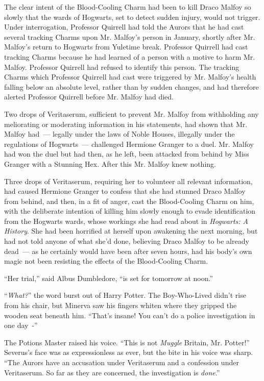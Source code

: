 The clear intent of the Blood-Cooling Charm had been to kill Draco Malfoy so slowly that the wards of Hogwarts, set to detect sudden injury, would not trigger. Under interrogation, Professor Quirrell had told the Aurors that he had cast several tracking Charms upon Mr. Malfoy's person in January, shortly after Mr. Malfoy's return to Hogwarts from Yuletime break. Professor Quirrell had cast tracking Charms because he had learned of a person with a motive to harm Mr. Malfoy. Professor Quirrell had refused to identify this person. The tracking Charms which Professor Quirrell had cast were triggered by Mr. Malfoy's health falling below an absolute level, rather than by sudden changes, and had therefore alerted Professor Quirrell before Mr. Malfoy had died.

Two drops of Veritaserum, sufficient to prevent Mr. Malfoy from withholding any meliorating or moderating information in his statements, had shown that Mr. Malfoy had~--- legally under the laws of Noble Houses, illegally under the regulations of Hogwarts~--- challenged Hermione Granger to a duel. Mr. Malfoy had won the duel but had then, as he left, been attacked from behind by Miss Granger with a Stunning Hex. After this Mr. Malfoy knew nothing.

Three drops of Veritaserum, requiring her to volunteer all relevant information, had caused Hermione Granger to confess that she had stunned Draco Malfoy from behind, and then, in a fit of anger, cast the Blood-Cooling Charm on him, with the deliberate intention of killing him slowly enough to evade identification from the Hogwarts wards, whose workings she had read about in \emph{Hogwarts: A History}. She had been horrified at herself upon awakening the next morning, but had not told anyone of what she'd done, believing Draco Malfoy to be already dead~--- as he certainly would have been after seven hours, had his body's own magic not been resisting the effects of the Blood-Cooling Charm.

``Her trial,'' said Albus Dumbledore, ``is set for tomorrow at noon.''

``\emph{What?}'' the word burst out of Harry Potter. The Boy-Who-Lived didn't rise from his chair, but Minerva saw his fingers whiten where they gripped the wooden seat beneath him. ``That's insane! You can't do a police investigation in one day~-''

The Potions Master raised his voice. ``This is not \emph{Muggle} Britain, Mr. Potter!'' Severus's face was as expressionless as ever, but the bite in his voice was sharp. ``The Aurors have an accusation under Veritaserum and a confession under Veritaserum. So far as they are concerned, the investigation is \emph{done}.''

